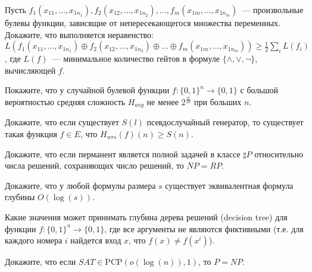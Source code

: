 \setcounter{curtask}{15}



\begin{task}
    Пусть $f_1(x_{1 1}, \dots, x_{1 n_1}), f_2(x_{1 2}, \dots, x_{1 n_2}), \dots, f_m(x_{1 m}, \dots, x_{1 n_m})$~--- произвольные
    булевы функции, зависящие от непересекающегося множества переменных. Докажите, что выполняется неравенство:
    $L(f_1(x_{1 1}, \dots, x_{1 n_1}) \oplus f_2(x_{1 2}, \dots, x_{1 n_2}) \oplus \dots \oplus f_m(x_{1 m}, \dots, x_{1 n_m}))
    \ge \frac{1}{2} \sum\limits_{i} L(f_i)$, где $L(f)$~--- минимальное количество гейтов в формуле $\{\land, \lor, \neg\}$,
    вычисляющей $f$.
\end{task}

\begin{task}
    Покажите, что у случайной булевой функции $f: \{0, 1\}^n \rightarrow \{0, 1\}$ с большой вероятностью средняя сложность
    $H_{avg}$ не менее $2^{\frac{n}{10}}$ при больших $n$.
\end{task}

\begin{task}
    Докажите, что если существует $S(l)$ псевдослучайный генератор, то существует такая функция $f \in E$, что $H_{wrs}(f)(n) \ge
    S(n)$.
\end{task}

\begin{task}
    Докажите, что если перманент является полной задачей в классе $\sharp P$ относительно числа решений, сохраняющих число
    решений, то $NP = RP$.
\end{task}


\breakline


\begin{ptask}{9}
    Докажите, что у любой формулы размера $s$ существует эквивалентная формула глубины $O(\log(s))$.
\end{ptask}

\begin{ptask}{10}
    Какие значения может принимать глубина дерева решений (decision tree) для функции $f: \{0, 1\}^n \rightarrow \{0, 1\}$, где
    все аргументы не являются фиктивными (т.е. для каждого номера $i$ найдется вход $x$, что $f(x) \neq f(x^{i})$).
\end{ptask}

\begin{ptask}{14}
    Докажите, что если $SAT \in \mathrm{PCP}(o(\log(n)), 1)$, то $P = NP$.
\end{ptask}

